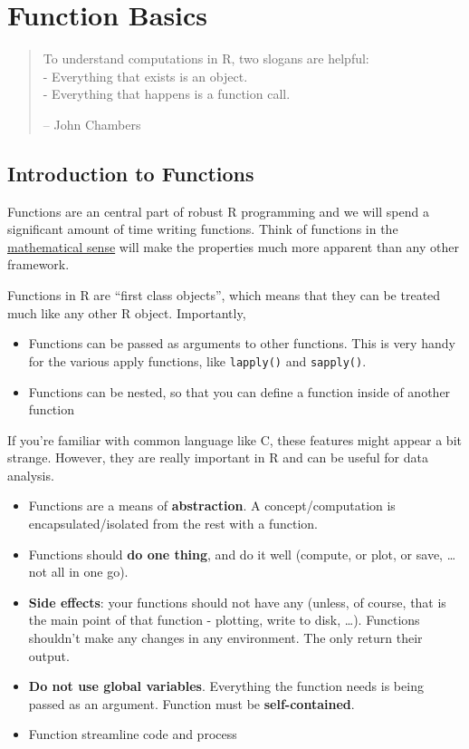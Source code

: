 \documentclass[]{book}
\providecommand{\tightlist}{%
  \setlength{\itemsep}{0pt}\setlength{\parskip}{0pt}}
\begin{document}
\chapter{Function Basics}\label{function-basics}

\begin{quote}
To understand computations in R, two slogans are helpful:\\
- Everything that exists is an object.\\
- Everything that happens is a function call.

-- John Chambers
\end{quote}

\section{Introduction to Functions}\label{introduction-to-functions}

Functions are an central part of robust R programming and we will spend
a significant amount of time writing functions. Think of functions in
the
\href{https://en.wikipedia.org/wiki/Function_(mathematics)}{mathematical
sense} will make the properties much more apparent than any other
framework.

Functions in R are ``first class objects'', which means that they can be
treated much like any other R object. Importantly,

\begin{itemize}
\item
  Functions can be passed as arguments to other functions. This is very
  handy for the various apply functions, like \texttt{lapply()} and
  \texttt{sapply()}.
\item
  Functions can be nested, so that you can define a function inside of
  another function
\end{itemize}

If you're familiar with common language like C, these features might
appear a bit strange. However, they are really important in R and can be
useful for data analysis.

\begin{itemize}
\tightlist
\item
  Functions are a means of \textbf{abstraction}. A concept/computation
  is encapsulated/isolated from the rest with a function.
\item
  Functions should \textbf{do one thing}, and do it well (compute, or
  plot, or save, \ldots{} not all in one go).
\item
  \textbf{Side effects}: your functions should not have any (unless, of
  course, that is the main point of that function - plotting, write to
  disk, \ldots{}). Functions shouldn't make any changes in any
  environment. The only return their output.
\item
  \textbf{Do not use global variables}. Everything the function needs is
  being passed as an argument. Function must be \textbf{self-contained}.
\item
  Function streamline code and process
\end{itemize}
\end{document}
